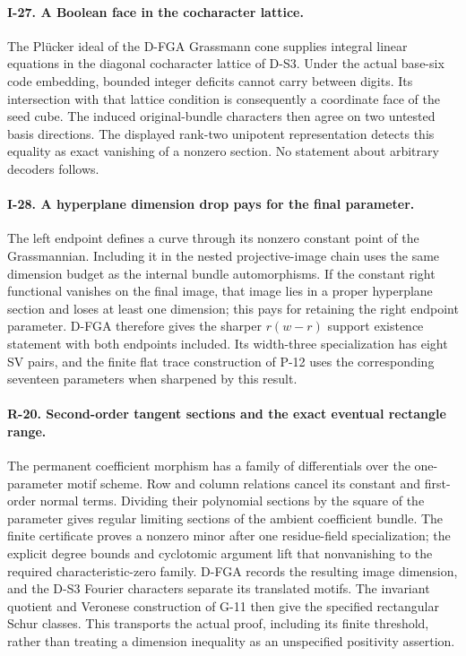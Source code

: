 \paragraph{I-27. A Boolean face in the cocharacter lattice.}
The Pl\"ucker ideal of the D-FGA Grassmann cone supplies integral linear
equations in the diagonal cocharacter lattice of D-S3. Under the actual
base-six code embedding, bounded integer deficits cannot carry between
digits. Its intersection with that lattice condition is consequently a
coordinate face of the seed cube. The induced original-bundle characters
then agree on two untested basis directions. The displayed rank-two
unipotent representation detects this equality as exact vanishing of a
nonzero section. No statement about arbitrary decoders follows.

\paragraph{I-28. A hyperplane dimension drop pays for the final parameter.}
The left endpoint defines a curve through its nonzero constant point of
the Grassmannian. Including it in the nested projective-image chain uses
the same dimension budget as the internal bundle automorphisms. If the
constant right functional vanishes on the final image, that image lies
in a proper hyperplane section and loses at least one dimension; this
pays for retaining the right endpoint parameter. D-FGA therefore gives
the sharper $r(w-r)$ support existence statement with both endpoints
included. Its width-three specialization has eight SV pairs, and the
finite flat trace construction of P-12 uses the corresponding seventeen
parameters when sharpened by this result.


\paragraph{R-20. Second-order tangent sections and the exact eventual rectangle range.}
The permanent coefficient morphism has a family of differentials over
the one-parameter motif scheme. Row and column relations cancel its
constant and first-order normal terms. Dividing their polynomial
sections by the square of the parameter gives regular limiting sections
of the ambient coefficient bundle. The finite certificate proves a
nonzero minor after one residue-field specialization; the explicit
degree bounds and cyclotomic argument lift that nonvanishing to the
required characteristic-zero family. D-FGA records the resulting image
dimension, and the D-S3 Fourier characters separate its translated
motifs. The invariant quotient and Veronese construction of G-11 then
give the specified rectangular Schur classes. This transports the
actual proof, including its finite threshold, rather than treating a
dimension inequality as an unspecified positivity assertion.

